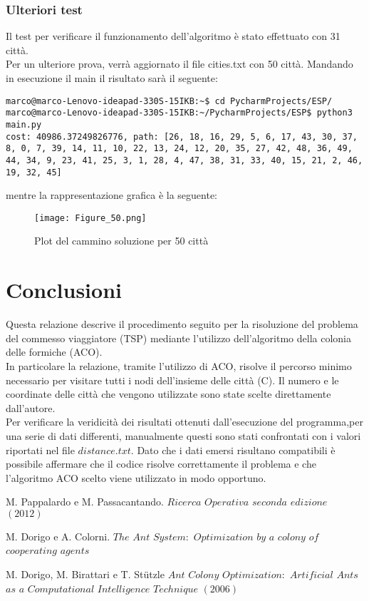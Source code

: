 \documentclass[a4paper,12pt]{report}
\begin{document}
\subsection{Ulteriori test}
Il test per verificare il funzionamento dell'algoritmo è stato effettuato con 31 città.\\
Per un ulteriore prova, verrà aggiornato il file cities.txt con 50 città.
Mandando in esecuzione il main il risultato sarà il seguente:
\begin{lstlisting}
marco@marco-Lenovo-ideapad-330S-15IKB:~$ cd PycharmProjects/ESP/
marco@marco-Lenovo-ideapad-330S-15IKB:~/PycharmProjects/ESP$ python3 main.py 
cost: 40986.37249826776, path: [26, 18, 16, 29, 5, 6, 17, 43, 30, 37, 8, 0, 7, 39, 14, 11, 10, 22, 13, 24, 12, 20, 35, 27, 42, 48, 36, 49, 44, 34, 9, 23, 41, 25, 3, 1, 28, 4, 47, 38, 31, 33, 40, 15, 21, 2, 46, 19, 32, 45]
\end{lstlisting}
mentre la rappresentazione grafica è la seguente:
\begin{figure}[H]
    \centering
    \texttt{[image: Figure\_50.png]}
    \caption{Plot del cammino soluzione per 50 città}
    \label{fig:my_label}
\end{figure}
\chapter{Conclusioni}
Questa relazione descrive il procedimento seguito per la risoluzione del problema del commesso viaggiatore (TSP) mediante l'utilizzo dell'algoritmo della colonia delle formiche (ACO).\\
In particolare la relazione, tramite l'utilizzo di ACO, risolve il percorso minimo necessario per visitare tutti i nodi dell'insieme delle città (C). Il numero e le coordinate delle città che vengono utilizzate sono state scelte direttamente dall'autore.\\
Per verificare la veridicità dei risultati ottenuti dall'esecuzione del programma,per una serie di dati differenti, manualmente questi sono stati confrontati con i valori riportati nel file $distance.txt$. Dato che i dati emersi risultano compatibili è possibile affermare che il codice risolve correttamente il problema e che l'algoritmo ACO scelto viene utilizzato in modo opportuno.
\begin{thebibliography}{}
\bibitem{}
\begin{itemize}
     M. Pappalardo e M. Passacantando. $Ricerca$ $Operativa$ $seconda$ $edizione$ $(2012)$ 
\end{itemize}
\bibitem{}
\begin{itemize}
    M. Dorigo e A. Colorni. $The$ $Ant$ $System:$ $Optimization$ $by$ $a$ $colony$ $of$ $cooperating$ $agents$
\end{itemize}
\bibitem{}
\begin{itemize}
    M. Dorigo, M. Birattari e T. Stützle $Ant$ $Colony$ $Optimization:$ $Artificial$ $Ants$ $as$ $a$ $Computational$ $Intelligence$ $Technique$ $(2006)$
\end{itemize}
\end{thebibliography}
\end{document}

